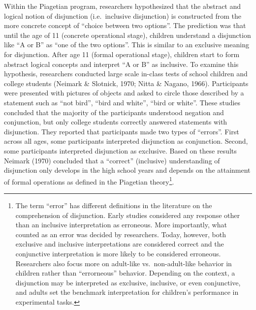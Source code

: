 \documentclass[,man,floatsintext]{apa6}
\let\rmarkdownfootnote\footnote%
\def\footnote{\protect\rmarkdownfootnote}
\begin{document}
Within the Piagetian program, researchers hypothesized that the abstract and logical notion of disjunction (i.e.~inclusive disjunction) is constructed from the more concrete concept of \enquote{choice between two options}. The prediction was that until the age of 11 (concrete operational stage), children understand a disjunction like \enquote{A or B} as \enquote{one of the two options}. This is similar to an exclusive meaning for disjunction. After age 11 (formal operational stage), children start to form abstract logical concepts and interpret \enquote{A or B} as inclusive. To examine this hypothesis, researchers conducted large scale in-class tests of school children and college students (Neimark \& Slotnick, 1970; Nitta \& Nagano, 1966). Participants were presented with pictures of objects and asked to circle those described by a statement such as \enquote{not bird}, \enquote{bird and white}, \enquote{bird or white}. These studies concluded that the majority of the participants understood negation and conjunction, but only college students correctly answered statements with disjunction. They reported that participants made two types of \enquote{errors}. First across all ages, some participants interpreted disjunction as conjunction. Second, some participants interpreted disjunction as exclusive. Based on these results Neimark (1970) concluded that a \enquote{correct} (inclusive) understanding of disjunction only develops in the high school years and depends on the attainment of formal operations as defined in the Piagetian theory\footnote{The term \enquote{error} has different definitions in the literature on the comprehension of disjunction. Early studies considered any response other than an inclusive interpretation as erroneous. More importantly, what counted as an error was decided by researchers. Today, however, both exclusive and inclusive interpretations are considered correct and the conjunctive interpretation is more likely to be considered erroneous. Researchers also focus more on adult-like vs.~non-adult-like behavior in children rather than \enquote{errorneous} behavior. Depending on the context, a disjunction may be interpreted as exclusive, inclusive, or even conjunctive, and adults set the benchmark interpretation for children's performance in experimental tasks.}.
\end{document}
